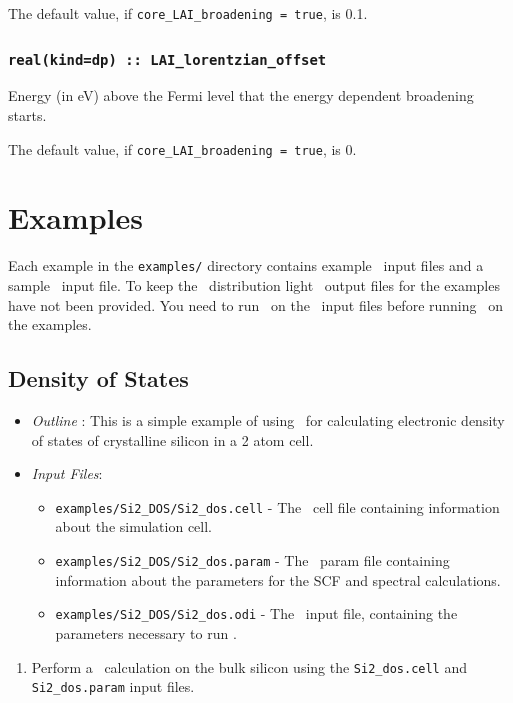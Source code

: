 \documentclass[a4paper,11pt,twoside]{book}
\begin{document}
{The default value, if \verb#core_LAI_broadening = true#, is 0.1. 

\subsection[core\_lorentzian\_offset]{\tt real(kind=dp) :: LAI\_lorentzian\_offset}
Energy (in eV) above the Fermi level that the energy dependent broadening starts.  

The default value, if \verb#core_LAI_broadening = true#, is 0.


\chapter{Examples}

Each example in the \verb#examples/# directory contains example \castep\ input files and a sample \optados\ input file. To keep the \optados\ distribution light \castep\ output files for the examples have not been provided. You need to run \castep\ on the \castep\ input files before running \optados\ on the examples.

\section{Density of States}
\begin{itemize}
\item \emph{Outline} : This is a simple example of using \optados\ for calculating electronic density of states of crystalline silicon in a 2 atom cell.
\item \emph{Input Files}:
\begin{itemize}
\item \verb#examples/Si2_DOS/Si2_dos.cell# - The \castep\ cell file containing information about the simulation cell.
\item \verb#examples/Si2_DOS/Si2_dos.param# - The \castep\ param file containing information about the parameters for the SCF and spectral calculations.
\item \verb#examples/Si2_DOS/Si2_dos.odi# - The \optados\ input file, containing the parameters necessary to run \optados.
\end{itemize}
\end{itemize}

\begin{enumerate}
\item Perform a \castep\ calculation on the bulk silicon using the  \verb#Si2_dos.cell#  and \verb#Si2_dos.param# input files. 


\end{enumerate}}
\end{document}
